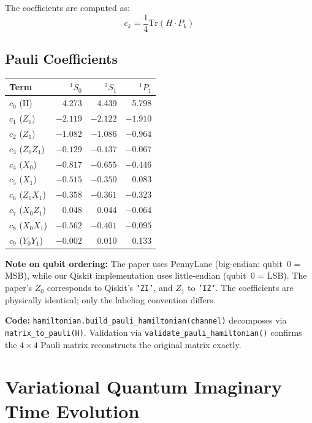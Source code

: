 \documentclass[11pt,a4paper]{article}
\begin{document}
The coefficients are computed as:
\begin{equation}
  c_k = \frac{1}{4}\text{Tr}(H \cdot P_k)
\end{equation}

\subsection{Pauli Coefficients}

\begin{center}
\begin{tabular}{l r r r}
\toprule
Term & ${}^1S_0$ & ${}^3S_1$ & ${}^1P_1$ \\
\midrule
$c_0$ (II) & 4.273 & 4.439 & 5.798 \\
$c_1$ ($Z_0$) & $-2.119$ & $-2.122$ & $-1.910$ \\
$c_2$ ($Z_1$) & $-1.082$ & $-1.086$ & $-0.964$ \\
$c_3$ ($Z_0 Z_1$) & $-0.129$ & $-0.137$ & $-0.067$ \\
$c_4$ ($X_0$) & $-0.817$ & $-0.655$ & $-0.446$ \\
$c_5$ ($X_1$) & $-0.515$ & $-0.350$ & 0.083 \\
$c_6$ ($Z_0 X_1$) & $-0.358$ & $-0.361$ & $-0.323$ \\
$c_7$ ($X_0 Z_1$) & 0.048 & 0.044 & $-0.064$ \\
$c_8$ ($X_0 X_1$) & $-0.562$ & $-0.401$ & $-0.095$ \\
$c_9$ ($Y_0 Y_1$) & $-0.002$ & 0.010 & 0.133 \\
\bottomrule
\end{tabular}
\end{center}

\textbf{Note on qubit ordering:} The paper uses PennyLane (big-endian: qubit~0 = MSB), while our Qiskit implementation uses little-endian (qubit~0 = LSB). The paper's $Z_0$ corresponds to Qiskit's \texttt{'ZI'}, and $Z_1$ to \texttt{'IZ'}. The coefficients are physically identical; only the labeling convention differs.

\vspace{0.3em}
\noindent\textbf{Code:} \texttt{hamiltonian.build\_pauli\_hamiltonian(channel)} decomposes via \texttt{matrix\_to\_pauli(H)}. Validation via \texttt{validate\_pauli\_hamiltonian()} confirms the $4\times 4$ Pauli matrix reconstructs the original matrix exactly.


\section{Variational Quantum Imaginary Time Evolution}
\end{document}
